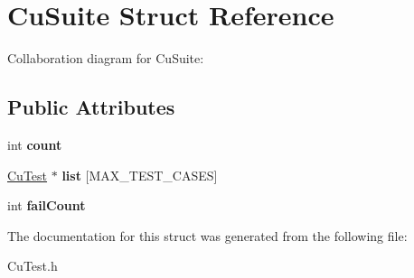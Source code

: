 \hypertarget{structCuSuite}{}\section{Cu\+Suite Struct Reference}
\label{structCuSuite}


Collaboration diagram for Cu\+Suite\+:
\subsection*{Public Attributes}
\begin{DoxyCompactItemize}
\item 
\mbox{\label{structCuSuite_a44b3a5aa4c9b027a6c680c78cdcb9da4}} 
int {\bfseries count}
\item 
\mbox{\label{structCuSuite_a16efbf8411fefbfe58e3c1f7f741241c}} 
\hyperlink{structCuTest}{Cu\+Test} $\ast$ {\bfseries list} \mbox{[}M\+A\+X\+\_\+\+T\+E\+S\+T\+\_\+\+C\+A\+S\+ES\mbox{]}
\item 
\mbox{\label{structCuSuite_ac768ec100a0423c8e9e9a0859c5c5dbd}} 
int {\bfseries fail\+Count}
\end{DoxyCompactItemize}


The documentation for this struct was generated from the following file\+:\begin{DoxyCompactItemize}
\item 
Cu\+Test.\+h\end{DoxyCompactItemize}
